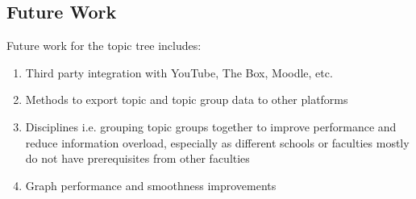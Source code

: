 \subsection{Future Work}
Future work for the topic tree includes:

\begin{enumerate}
    \item Third party integration with YouTube, The Box, Moodle, etc.
    \item Methods to export topic and topic group data to other platforms
    \item Disciplines i.e. grouping topic groups together to improve performance and reduce information overload, especially as different schools or faculties mostly do not have prerequisites from other faculties
    \item Graph performance and smoothness improvements
\end{enumerate} 

